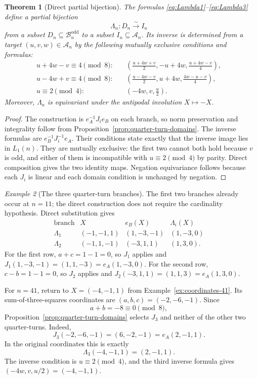 \documentclass[11pt]{amsart}
\newtheorem{theorem}{Theorem}[section]
\theoremstyle{definition}
\theoremstyle{remark}
\newtheorem{example}[theorem]{Example}
\newcommand{\An}{\mathcal A_n}
\newcommand{\Bodd}{\mathcal B_n^{\mathrm{odd}}}
\begin{document}
\begin{theorem}[Direct partial bijection]\label{thm:direct-layer}
The formulas \eqref{eq:Lambda1}--\eqref{eq:Lambda3} define a partial
bijection
\[
 \Lambda_n:D_n\xrightarrow{\sim}I_n
\]
from a subset $D_n\subseteq\Bodd$ to a subset $I_n\subseteq\An$.  Its inverse
is determined from a target $(u,v,w)\in\An$ by the following mutually
exclusive conditions and formulas:
\begin{align*}
 u+4w-v\equiv4\pmod8:
 &\quad
 \left(\frac{u+4w+v}{2},-u+4w,\frac{u+4w-v}{4}\right),\\
 u-4w+v\equiv4\pmod8:
 &\quad
 \left(\frac{u-4w-v}{2},u+4w,\frac{4w-u-v}{4}\right),\\
 u\equiv2\pmod4:
 &\quad
 \left(-4w,v,\frac{u}{2}\right).
\end{align*}
Moreover, $\Lambda_n$ is equivariant under the antipodal involution
$X\mapsto-X$.
\end{theorem}

\begin{proof}
The construction is $e_A^{-1}J_i e_B$ on each branch, so norm preservation and
integrality follow from Proposition~\ref{prop:quarter-turn-domains}.  The
inverse formulas are $e_B^{-1}J_i^{-1}e_A$.  Their conditions state exactly
that the inverse image lies in $L_1(n)$.  They are mutually exclusive: the first
two cannot both hold because $v$ is odd, and either of them is incompatible
with $u\equiv2\pmod4$ by parity.  Direct composition gives the two identity
maps.  Negation equivariance follows because each $J_i$ is linear and each
domain condition is unchanged by negation.
\end{proof}

\begin{example}[The three quarter-turn branches]
\label{ex:quarter-turn-41}
The first two branches already occur at $n=11$; the direct construction does
not require the cardinality hypothesis.  Direct substitution gives
\[
\begin{array}{c|c|c|c}
\text{branch}&X&e_B(X)&\Lambda_i(X)\\ \hline
\Lambda_1&(-1,-1,1)&(1,-3,-1)&(1,-3,0)\\
\Lambda_2&(-1,1,-1)&(-3,1,1)&(1,3,0).
\end{array}
\]
For the first row, $a+c=1-1=0$, so $J_1$ applies and
$J_1(1,-3,-1)=(1,1,-3)=e_A(1,-3,0)$.  For the second row,
$c-b=1-1=0$, so $J_2$ applies and
$J_2(-3,1,1)=(1,1,3)=e_A(1,3,0)$.

For $n=41$, return to $X=(-4,-1,1)$ from
Example~\ref{ex:coordinates-41}.  Its
sum-of-three-squares coordinates are $(a,b,c)=(-2,-6,-1)$.  Since
\[
 a+b=-8\equiv0\pmod8,
\]
Proposition~\ref{prop:quarter-turn-domains} selects $J_3$ and neither of the
other two quarter-turns.  Indeed,
\[
 J_3(-2,-6,-1)=(6,-2,-1)=e_A(2,-1,1).
\]
In the original coordinates this is exactly
\[
 \Lambda_3(-4,-1,1)=(2,-1,1).
\]
The inverse condition is $u\equiv2\pmod4$, and the third inverse formula gives
$(-4w,v,u/2)=(-4,-1,1)$.
\end{example}
\end{document}
